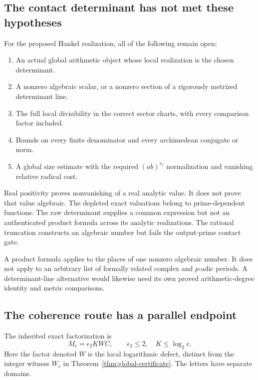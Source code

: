 \subsection{The contact determinant has not met these hypotheses}
For the proposed Hankel realization, all of the following remain open:
\begin{enumerate}
\item An actual global arithmetic object whose local realization is the chosen determinant.
\item A nonzero algebraic scalar, or a nonzero section of a rigorously metrized determinant line.
\item The full local divisibility in the correct sector charts, with every comparison factor included.
\item Bounds on every finite denominator and every archimedean conjugate or norm.
\item A global size estimate with the required $(ab)^{s_r}$ normalization and vanishing relative radical cost.
\end{enumerate}
Real positivity proves nonvanishing of a real analytic value. It does not prove that value algebraic. The depleted exact valuations belong to prime-dependent functions. The raw determinant supplies a common expression but not an authenticated product formula across its analytic realizations. The rational truncation constructs an algebraic number but fails the output-prime contact gate.

A product formula applies to the places of one nonzero algebraic number. It does not apply to an arbitrary list of formally related complex and $p$-adic periods. A determinant-line alternative would likewise need its own proved arithmetic-degree identity and metric comparisons.


\subsection{The coherence route has a parallel endpoint}
The inherited exact factorization is
\[
 M_c=\epsilon_2KWC,\qquad\epsilon_2\le2,\quad K\le\log_2c.
\]
Here the factor denoted $W$ is the local logarithmic defect, distinct from the integer witness $W_r$ in Theorem~\ref{thm:global-certificate}. The letters have separate domains.

